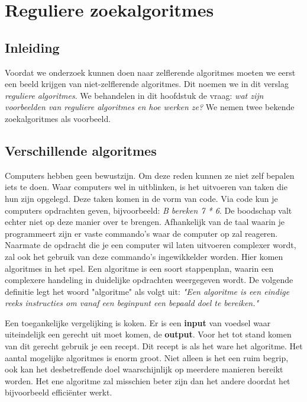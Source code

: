
\section{Reguliere zoekalgoritmes}

\subsection{Inleiding}
Voordat we onderzoek kunnen doen naar zelflerende algoritmes moeten we eerst een beeld krijgen van niet-zelflerende algoritmes. Dit noemen we in dit verslag \textit{reguliere algoritmes}. We behandelen in dit hoofdstuk de vraag: \textit{wat zijn voorbeelden van reguliere algoritmes en hoe werken ze?} We nemen twee bekende zoekalgoritmes als voorbeeld.


\subsection{Verschillende algoritmes}
Computers hebben geen bewustzijn. Om deze reden kunnen ze niet zelf bepalen iets te doen. Waar computers wel in uitblinken, is het uitvoeren van taken die hun zijn opgelegd. Deze taken komen in de vorm van code. Via code kun je computers opdrachten geven, bijvoorbeeld: \textit{B
bereken 7 * 6}. De boodschap valt echter niet op deze manier over te brengen. Afhankelijk van de taal waarin je programmeert zijn er vaste commando's waar de computer op zal reageren.
Naarmate de opdracht die je een computer wil laten uitvoeren complexer wordt, zal ook het gebruik van deze commando's ingewikkelder worden. Hier komen algoritmes in het spel. Een algoritme is een soort stappenplan, waarin een complexere handeling in duidelijke opdrachten weergegeven wordt. De volgende definitie legt het woord "algoritme" als volgt uit: \textit{"Een algoritme is een eindige reeks instructies om vanaf een beginpunt een bepaald doel te bereiken."} \cite{WoordenOrg}

Een toegankelijke vergelijking is koken. Er is een \textbf{input} van voedsel waar uiteindelijk een gerecht uit moet komen, de \textbf{output}. Voor het tot stand komen van dit gerecht gebruik je een recept. Dit recept is als het ware het algoritme.
Het aantal mogelijke algoritmes is enorm groot. Niet alleen is het een ruim begrip, ook kan het desbetreffende doel waarschijnlijk op meerdere manieren bereikt worden. Het ene algoritme zal misschien beter zijn dan het andere doordat het bijvoorbeeld effici\"enter werkt.

